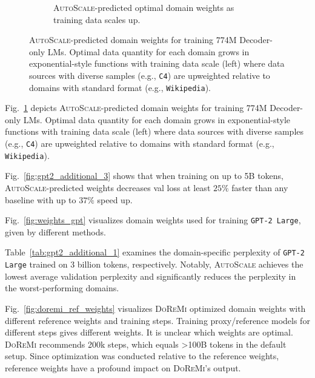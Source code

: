 \documentclass{article} %
\begin{document}
\begin{appendices}{}
\begin{figure}[h!]
\begin{subfigure}[b]{0.51\textwidth}
        \caption{\textsc{AutoScale}-predicted optimal domain weights as training data scales up.}
    \end{subfigure}
    \caption{\textsc{AutoScale}-predicted domain weights for training 774M Decoder-only LMs. Optimal data quantity for each domain grows in exponential-style functions with training data scale (left) where data sources with diverse samples (e.g., \texttt{C4}) are upweighted relative to domains with standard format (e.g., \texttt{Wikipedia}).}\vspace{-0.5em}
    \label{fig:figure4}
\end{figure}

Fig.~\ref{fig:figure4} depicts \textsc{AutoScale}-predicted domain weights for training 774M Decoder-only LMs. Optimal data quantity for each domain grows in exponential-style functions with training data scale (left) where data sources with diverse samples (e.g., \texttt{C4}) are upweighted relative to domains with standard format (e.g., \texttt{Wikipedia}).

Fig.~\ref{fig:gpt2_additional_3} shows that when training on up to 5B tokens, \textsc{AutoScale}-predicted weights decreases val loss at least $25\%$ faster than any baseline with up to $37\%$ speed up. 

Fig.~\ref{fig:weights_gpt} visualizes domain weights used for training \texttt{GPT-2 Large}, given by different methods.

Table~\ref{tab:gpt2_additional_1} examines the domain-specific perplexity of \texttt{GPT-2 Large} trained on 3 billion tokens, respectively. Notably, \textsc{AutoScale} achieves the lowest average validation perplexity and significantly reduces the perplexity in the worst-performing domains.

Fig.~\ref{fig:doremi_ref_weights} visualizes \textsc{DoReMi} optimized domain weights with different reference weights and training steps. Training proxy/reference models for different steps gives different weights. It is unclear which weights are optimal. \textsc{DoReMi} recommends 200k steps, which equals >100B tokens in the default setup. Since optimization was conducted relative to the reference weights, reference weights have a profound impact on \textsc{DoReMi}'s output.





\end{appendices}
\end{document}
